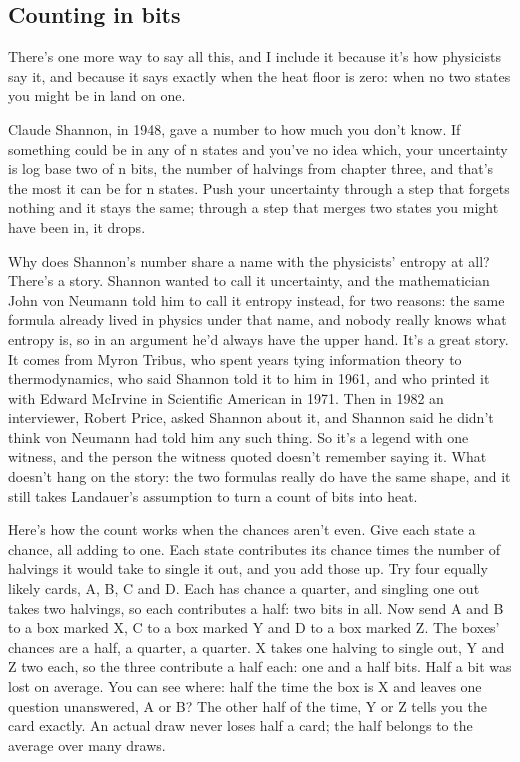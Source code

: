 \documentclass[11pt,twoside]{article}
\theoremstyle{thielethm}
\theoremstyle{thieledef}
\theoremstyle{thieledef}
\theoremstyle{thieledef}
\theoremstyle{thielethm}
\theoremstyle{thieleobs}
\theoremstyle{thielethm}
\begin{document}
\subsection{Counting in bits}

There's one more way to say all this, and I include it because it's how physicists say it, and because it says exactly when the heat floor is zero: when no two states you might be in land on one.

Claude Shannon, in 1948, gave a number to how much you don't know. If something could be in any of n states and you've no idea which, your uncertainty is log base two of n bits, the number of halvings from chapter three, and that's the most it can be for n states. Push your uncertainty through a step that forgets nothing and it stays the same; through a step that merges two states you might have been in, it drops.

Why does Shannon's number share a name with the physicists' entropy at all? There's a story. Shannon wanted to call it uncertainty, and the mathematician John von Neumann told him to call it entropy instead, for two reasons: the same formula already lived in physics under that name, and nobody really knows what entropy is, so in an argument he'd always have the upper hand. It's a great story. It comes from Myron Tribus, who spent years tying information theory to thermodynamics, who said Shannon told it to him in 1961, and who printed it with Edward McIrvine in Scientific American in 1971. Then in 1982 an interviewer, Robert Price, asked Shannon about it, and Shannon said he didn't think von Neumann had told him any such thing. So it's a legend with one witness, and the person the witness quoted doesn't remember saying it. What doesn't hang on the story: the two formulas really do have the same shape, and it still takes Landauer's assumption to turn a count of bits into heat.

Here's how the count works when the chances aren't even. Give each state a chance, all adding to one. Each state contributes its chance times the number of halvings it would take to single it out, and you add those up. Try four equally likely cards, A, B, C and D. Each has chance a quarter, and singling one out takes two halvings, so each contributes a half: two bits in all. Now send A and B to a box marked X, C to a box marked Y and D to a box marked Z. The boxes' chances are a half, a quarter, a quarter. X takes one halving to single out, Y and Z two each, so the three contribute a half each: one and a half bits. Half a bit was lost on average. You can see where: half the time the box is X and leaves one question unanswered, A or B? The other half of the time, Y or Z tells you the card exactly. An actual draw never loses half a card; the half belongs to the average over many draws.
\end{document}
